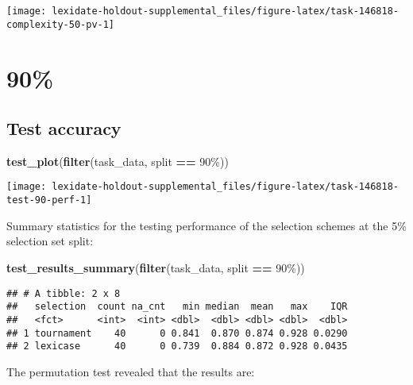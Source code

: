 \documentclass[
]{book}
\newenvironment{Shaded}{\begin{snugshade}}{\end{snugshade}}
\newcommand{\FunctionTok}[1]{\textcolor[rgb]{0.13,0.29,0.53}{\textbf{#1}}}
\newcommand{\NormalTok}[1]{#1}
\newcommand{\SpecialCharTok}[1]{\textcolor[rgb]{0.81,0.36,0.00}{\textbf{#1}}}
\newcommand{\StringTok}[1]{\textcolor[rgb]{0.31,0.60,0.02}{#1}}
\begin{document}
\texttt{[image: lexidate-holdout-supplemental\_files/figure-latex/task-146818-complexity-50-pv-1]}

\hypertarget{section-3}{%
\section{90\%}\label{section-3}}

\hypertarget{test-accuracy-3}{%
\subsection{Test accuracy}\label{test-accuracy-3}}

\begin{Shaded}
\begin{Highlighting}[]
\FunctionTok{test\_plot}\NormalTok{(}\FunctionTok{filter}\NormalTok{(task\_data, split }\SpecialCharTok{==} \StringTok{\textquotesingle{}90\%\textquotesingle{}}\NormalTok{))}
\end{Highlighting}
\end{Shaded}

\texttt{[image: lexidate-holdout-supplemental\_files/figure-latex/task-146818-test-90-perf-1]}

Summary statistics for the testing performance of the selection schemes at the 5\% selection set split:

\begin{Shaded}
\begin{Highlighting}[]
\FunctionTok{test\_results\_summary}\NormalTok{(}\FunctionTok{filter}\NormalTok{(task\_data, split }\SpecialCharTok{==} \StringTok{\textquotesingle{}90\%\textquotesingle{}}\NormalTok{))}
\end{Highlighting}
\end{Shaded}

\begin{verbatim}
## # A tibble: 2 x 8
##   selection  count na_cnt   min median  mean   max    IQR
##   <fct>      <int>  <int> <dbl>  <dbl> <dbl> <dbl>  <dbl>
## 1 tournament    40      0 0.841  0.870 0.874 0.928 0.0290
## 2 lexicase      40      0 0.739  0.884 0.872 0.928 0.0435
\end{verbatim}

The permutation test revealed that the results are:
\end{document}
